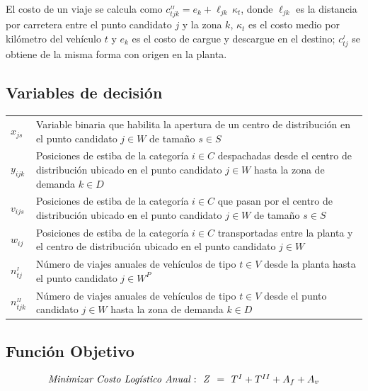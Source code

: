 \documentclass[fleqn, 11pt,letterpaper]{article}
\begin{document}
\vspace{3mm}
El costo de un viaje se calcula como $c^{_{II}}_{tjk} = e_k + \ell_{jk}\, \kappa_t$, donde $\ell_{jk}$ es la distancia por carretera entre el punto candidato $j$ y la zona $k$, $\kappa_t$ es el costo medio por kilómetro del vehículo $t$ y $e_k$ es el costo de cargue y descargue en el destino; $c^{_I}_{tj}$ se obtiene de la misma forma con origen en la planta.

\subsection*{Variables de decisión}
\vspace{2mm}

\begin{tabularx}{\textwidth}{lX}
     $x_{js}$  & Variable binaria que habilita la apertura de un centro de distribución en el punto candidato $j \in W$ de tamaño $s \in S$\\[6mm]
     $y_{ijk}$ & Posiciones de estiba de la categoría $i \in C$ despachadas desde el centro de distribución ubicado en el punto candidato $j \in W$ hasta la zona de demanda $k \in D$\\[6mm]
     $v_{ijs}$ & Posiciones de estiba de la categoría $i \in C$ que pasan por el centro de distribución ubicado en el punto candidato $j \in W$ de tamaño $s \in S$\\[6mm]
     $w_{ij}$  & Posiciones de estiba de la categoría $i \in C$ transportadas entre la planta y el centro de distribución ubicado en el punto candidato $j \in W$\\[6mm]
     $n^{_I}_{tj}$  & Número de viajes anuales de vehículos de tipo $t \in V$ desde la planta hasta el punto candidato $j \in W^{P}$\\[6mm]
     $n^{_{II}}_{tjk}$  & Número de viajes anuales de vehículos de tipo $t \in V$ desde el punto candidato $j \in W$ hasta la zona de demanda $k \in D$
\end{tabularx}

\subsection*{Función Objetivo}
\vspace{2mm}

\begin{equation}
    \label{obj}
    \begin{array}{llll}
    \mbox{\textit{Minimizar Costo Logístico Anual}}: & \! \! \mathit{Z} & \! \!=\! \! &
        T^{I}+T^{II}+A_{f}+A_{v}
    \end{array}
\end{equation}
\end{document}
